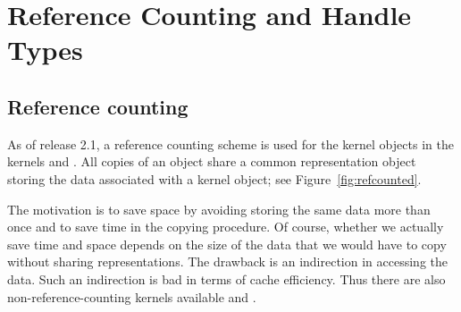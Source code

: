 
\chapter{Reference Counting and Handle Types\label{chap:reference_counting}}


\section{Reference counting}
As of release 2.1, a reference counting%
 scheme is used for
the kernel objects in the kernels  and 
. 
All copies of an object share a common representation object storing
the data associated with a kernel object; see Figure~\ref{fig:refcounted}.

The motivation is to save space by avoiding storing the same data more 
than once and to save time in the copying procedure. 
Of course, whether we actually save time and space depends on the size 
of the data that we would have to copy without sharing representations.
The drawback is an indirection in accessing the data. Such an indirection is 
bad in terms of cache efficiency. 
Thus there are also non-reference-counting kernels available
 and .

